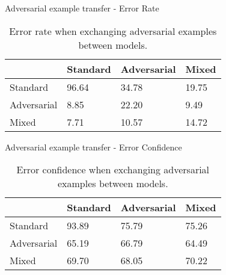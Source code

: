 \begin{tframe}{Adversarial example transfer - Error Rate}

\begin{table}[]
\centering
\label{my-label}
\begin{tabular}{@{}llll@{}}
\toprule
            & Standard & Adversarial & Mixed \\ \midrule
Standard    & 96.64    & 34.78       & 19.75 \\ 
Adversarial & 8.85     & 22.20       & 9.49  \\ 
Mixed       & 7.71     & 10.57       & 14.72 \\ \bottomrule
\end{tabular}
\caption{Error rate when exchanging adversarial examples between models.}
\end{table}

\end{tframe}


\begin{tframe}{Adversarial example transfer - Error Confidence}

\begin{table}[]
\centering
\label{my-label}
\begin{tabular}{@{}llll@{}}
\toprule
            & Standard & Adversarial & Mixed \\ \midrule
Standard    & 93.89    & 75.79       & 75.26 \\ 
Adversarial & 65.19    & 66.79       & 64.49 \\ 
Mixed       & 69.70    & 68.05       & 70.22 \\ \bottomrule
\end{tabular}
\caption{Error confidence when exchanging adversarial examples between models.}
\end{table}

\end{tframe}